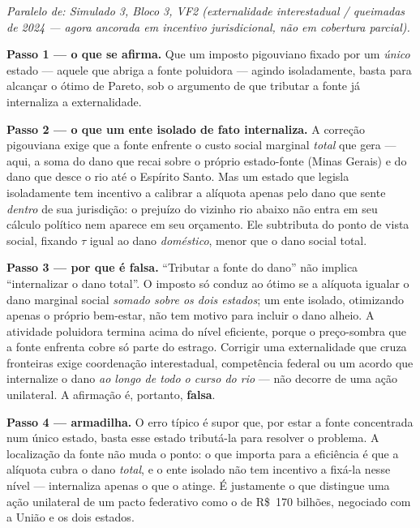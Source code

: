 \begin{solucao}
{\footnotesize\textit{Paralelo de: Simulado 3, Bloco 3, VF2 (externalidade interestadual / queimadas de 2024 — agora ancorada em incentivo jurisdicional, não em cobertura parcial).}}\par\vspace{0.2em}
\textbf{Passo 1 --- o que se afirma.} Que um imposto pigouviano fixado por um \emph{\'unico} estado --- aquele que abriga a fonte poluidora --- agindo isoladamente, basta para alcan\c{c}ar o \'otimo de Pareto, sob o argumento de que tributar a fonte j\'a internaliza a externalidade.

\textbf{Passo 2 --- o que um ente isolado de fato internaliza.} A corre\c{c}\~ao pigouviana exige que a fonte enfrente o custo social marginal \emph{total} que gera --- aqui, a soma do dano que recai sobre o pr\'oprio estado-fonte (Minas Gerais) e do dano que desce o rio at\'e o Esp\'irito Santo. Mas um estado que legisla isoladamente tem incentivo a calibrar a al\'iquota apenas pelo dano que sente \emph{dentro} de sua jurisdi\c{c}\~ao: o preju\'izo do vizinho rio abaixo n\~ao entra em seu c\'alculo pol\'itico nem aparece em seu or\c{c}amento. Ele subtributa do ponto de vista social, fixando $\tau$ igual ao dano \emph{dom\'estico}, menor que o dano social total.

\textbf{Passo 3 --- por que \'e falsa.} ``Tributar a fonte do dano'' n\~ao implica ``internalizar o dano total''. O imposto s\'o conduz ao \'otimo se a al\'iquota igualar o dano marginal social \emph{somado sobre os dois estados}; um ente isolado, otimizando apenas o pr\'oprio bem-estar, n\~ao tem motivo para incluir o dano alheio. A atividade poluidora termina acima do n\'ivel eficiente, porque o pre\c{c}o-sombra que a fonte enfrenta cobre s\'o parte do estrago. Corrigir uma externalidade que cruza fronteiras exige coordena\c{c}\~ao interestadual, compet\^encia federal ou um acordo que internalize o dano \emph{ao longo de todo o curso do rio} --- n\~ao decorre de uma a\c{c}\~ao unilateral. A afirma\c{c}\~ao \'e, portanto, \textbf{falsa}.

\textbf{Passo 4 --- armadilha.} O erro t\'ipico \'e supor que, por estar a fonte concentrada num \'unico estado, basta esse estado tribut\'a-la para resolver o problema. A localiza\c{c}\~ao da fonte n\~ao muda o ponto: o que importa para a efici\^encia \'e que a al\'iquota cubra o dano \emph{total}, e o ente isolado n\~ao tem incentivo a fix\'a-la nesse n\'ivel --- internaliza apenas o que o atinge. \'E justamente o que distingue uma a\c{c}\~ao unilateral de um pacto federativo como o de R\$~170 bilh\~oes, negociado com a Uni\~ao e os dois estados.


\end{solucao}
